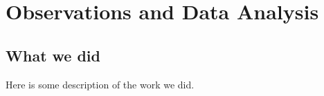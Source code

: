 \chapter{Observations and Data Analysis}
\label{c.Data}
\section{What we did}
\label{s.Work}
Here is some description of the work we did.\\

